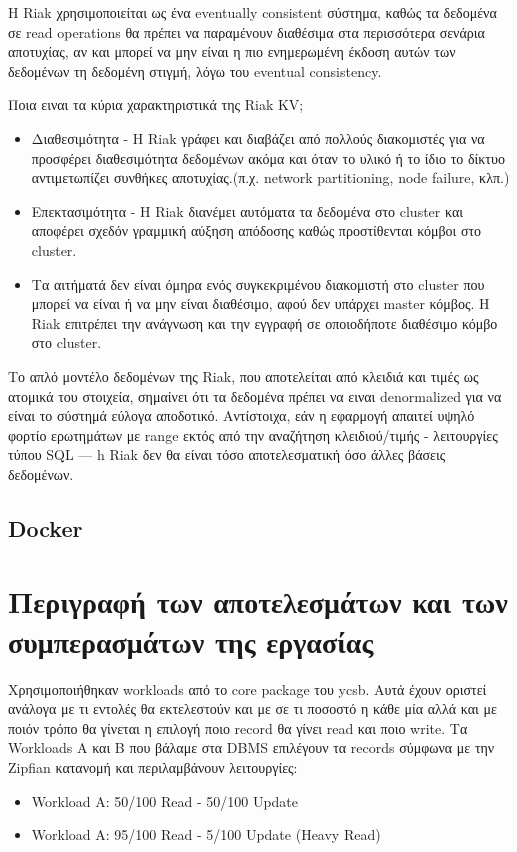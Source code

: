 \documentclass[conference]{IEEEtran}
\begin{document}
H Riak χρησιμοποιείται ως ένα eventually consistent σύστημα, καθώς τα δεδομένα σε read operations θα πρέπει να παραμένουν διαθέσιμα στα περισσότερα σενάρια αποτυχίας, αν και μπορεί να μην είναι η πιο ενημερωμένη έκδοση αυτών των δεδομένων τη δεδομένη στιγμή, λόγω του eventual consistency.

Ποια ειναι τα κύρια χαρακτηριστικά της Riak KV;
\begin{itemize}
    \item 
    Διαθεσιμότητα - H Riak γράφει και διαβάζει από πολλούς διακομιστές για να προσφέρει διαθεσιμότητα δεδομένων ακόμα και όταν το υλικό ή το ίδιο το δίκτυο αντιμετωπίζει συνθήκες αποτυχίας.(π.χ. network partitioning, node failure, κλπ.)
    
    \item 
    Επεκτασιμότητα - Η Riak διανέμει αυτόματα τα δεδομένα στο cluster και αποφέρει σχεδόν γραμμική αύξηση απόδοσης καθώς προστίθενται κόμβοι στο cluster.

    \item 
    Τα αιτήματά δεν είναι όμηρα ενός συγκεκριμένου διακομιστή στο cluster που μπορεί να είναι ή να μην είναι διαθέσιμο, αφού δεν υπάρχει master κόμβος. Η Riak επιτρέπει την ανάγνωση και την εγγραφή σε οποιοδήποτε διαθέσιμο κόμβο στο cluster.
\end{itemize}
Το απλό μοντέλο δεδομένων της Riak, που αποτελείται από κλειδιά και τιμές ως ατομικά του στοιχεία, σημαίνει ότι τα δεδομένα πρέπει να ειναι denormalized για να είναι το σύστημά εύλογα αποδοτικό. Αντίστοιχα, εάν η εφαρμογή απαιτεί υψηλό φορτίο ερωτημάτων με range εκτός από την αναζήτηση κλειδιού/τιμής - λειτουργίες τύπου SQL — h Riak δεν θα είναι τόσο αποτελεσματική όσο άλλες βάσεις δεδομένων.



\subsection{Docker}


\section{Περιγραφή των αποτελεσμάτων και των συμπερασμάτων της εργασίας}

Χρησιμοποιήθηκαν workloads από το core package του ycsb. Αυτά έχουν οριστεί ανάλογα με τι εντολές θα εκτελεστούν και με σε τι ποσοστό η κάθε μία αλλά και με ποιόν τρόπο θα γίνεται η επιλογή ποιο record θα γίνει read και ποιο write. Τα Workloads Α και B που βάλαμε στα DBMS επιλέγουν τα records σύμφωνα με την Zipfian κατανομή και περιλαμβάνουν λειτουργίες:
\begin{itemize}
\item 
Workload A: 50/100 Read - 50/100 Update
\item 
Workload A: 95/100 Read - 5/100 Update (Heavy Read)
\end{itemize}
\end{document}
